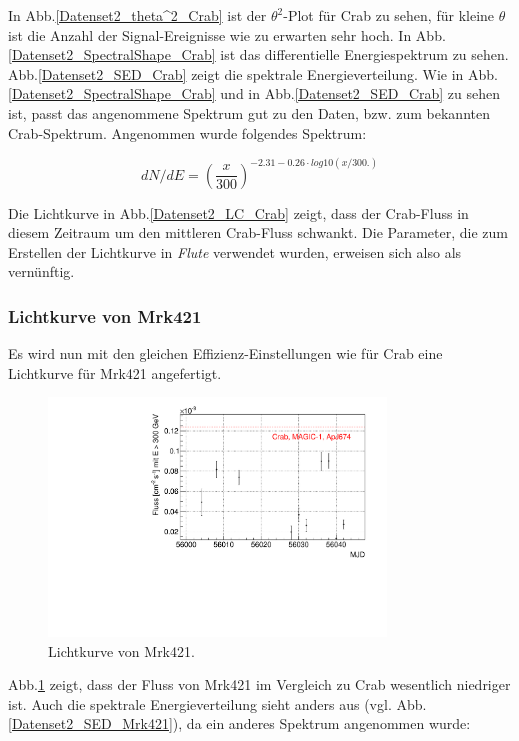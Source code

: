 In Abb.\ref{Datenset2_theta^2_Crab} ist der $\theta^2$-Plot für Crab zu sehen, für kleine $\theta$ ist die Anzahl der Signal-Ereignisse wie zu erwarten sehr hoch.
In Abb.\ref{Datenset2_SpectralShape_Crab} ist das differentielle Energiespektrum zu sehen.
Abb.\ref{Datenset2_SED_Crab} zeigt die spektrale Energieverteilung.
Wie in Abb.\ref{Datenset2_SpectralShape_Crab} und in Abb.\ref{Datenset2_SED_Crab} zu sehen ist, passt das angenommene Spektrum gut zu den Daten, bzw. zum bekannten Crab-Spektrum.
Angenommen wurde folgendes Spektrum:

\begin{equation}
dN/dE=\left(\frac{x}{300}\right)^{-2.31-0.26\cdot log10(x/300.)}
\end{equation}

Die Lichtkurve in Abb.\ref{Datenset2_LC_Crab} zeigt, dass der Crab-Fluss in diesem Zeitraum um den mittleren Crab-Fluss schwankt.
Die Parameter, die zum Erstellen der Lichtkurve in \textit{Flute} verwendet wurden, erweisen sich also als vernünftig.

\subsubsection{Lichtkurve von Mrk421}
Es wird nun mit den gleichen Effizienz-Einstellungen wie für Crab eine Lichtkurve für Mrk421 angefertigt.

\begin{figure}
    \centering
    \includegraphics[width=0.8\textwidth]{./Plots/04_MrkAnalyse/Datenset2/LC_Mrk421.pdf}
    \caption{Lichtkurve von Mrk421.}
    \label{Datenset2_LC_Mrk421}
\end{figure}

Abb.\ref{Datenset2_LC_Mrk421} zeigt, dass der Fluss von Mrk421 im Vergleich zu Crab wesentlich niedriger ist.
Auch die spektrale Energieverteilung sieht anders aus (vgl. Abb.\ref{Datenset2_SED_Mrk421}), da ein anderes Spektrum angenommen wurde:

